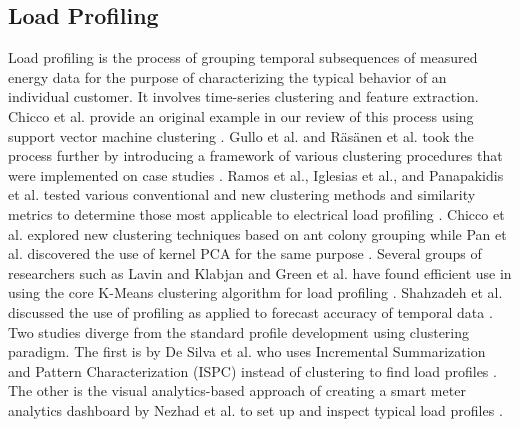 \documentclass[preprint,12pt,3p]{elsarticle}
\begin{document}
\subsection{Load Profiling}
Load profiling is the process of grouping temporal subsequences of measured energy data for the purpose of characterizing the typical behavior of an individual customer. It involves time-series clustering and feature extraction. Chicco et al. provide an original example in our review of this process using support vector machine clustering \cite{chicco_support_2009}. Gullo et al. and R\"as\"anen et al. took the process further by introducing a framework of various clustering procedures that were implemented on case studies \cite{gullo_low-voltage_2009,rasanen_feature-based_2009}. Ramos et al., Iglesias et al., and Panapakidis et al. tested various conventional and new clustering methods and similarity metrics to determine those most applicable to electrical load profiling \cite{iglesias_analysis_2013,ramos_typical_2012,panapakidis_evaluation_2015}. Chicco et al. explored new clustering techniques based on ant colony grouping while Pan et al. discovered the use of kernel PCA for the same purpose \cite{chicco_electrical_2013,pan_kernel-based_2015}. Several groups of researchers such as Lavin and Klabjan and Green et al. have found efficient use in using the core K-Means clustering algorithm for load profiling \cite{lavin_clustering_2014,green_divide_2014}. Shahzadeh et al. discussed the use of profiling as applied to forecast accuracy of temporal data \cite{shahzadeh_improving_2015}. Two studies diverge from the standard profile development using clustering paradigm. The first is by De Silva et al. who uses Incremental Summarization and Pattern Characterization (ISPC) instead of clustering to find load profiles \cite{de_silva_data_2011}. The other is the visual analytics-based approach of creating a smart meter analytics dashboard by Nezhad et al. to set up and inspect typical load profiles \cite{jarrah_nezhad_smartd:_2014}.
\end{document}
